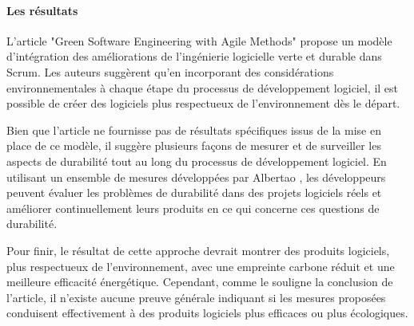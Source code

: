 \paragraph{Les résultats}
L'article "Green Software Engineering with Agile Methods" propose un modèle d'intégration des améliorations de l'ingénierie logicielle verte et durable dans Scrum. Les auteurs suggèrent qu'en incorporant des considérations environnementales à chaque étape du processus de développement logiciel, il est possible de créer des logiciels plus respectueux de l'environnement dès le départ.

Bien que l'article ne fournisse pas de résultats spécifiques issus de la mise en place de ce modèle, il suggère plusieurs façons de mesurer et de surveiller les aspects de durabilité tout au long du processus de développement logiciel. En utilisant un ensemble de mesures développées par Albertao \cite{Albertao}, les développeurs peuvent évaluer les problèmes de durabilité dans des projets logiciels réels et améliorer continuellement leurs produits en ce qui concerne ces questions de durabilité.

Pour finir, le résultat de cette approche devrait montrer des produits logiciels, plus respectueux de l'environnement, avec une empreinte carbone réduit et une meilleure efficacité énergétique. Cependant, comme le souligne la conclusion de l'article, il n'existe aucune preuve générale indiquant si les mesures proposées conduisent effectivement à des produits logiciels plus efficaces ou plus écologiques.